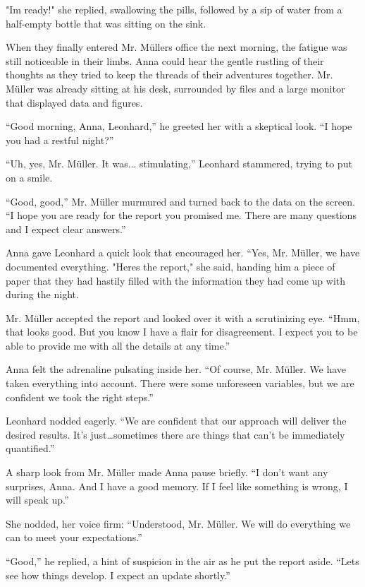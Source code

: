 \documentclass[
]{article}
\begin{document}
"I\textquotesingle m ready!" she replied, swallowing the pills, followed
by a sip of water from a half-empty bottle that was sitting on the sink.

When they finally entered Mr. Müller\textquotesingle s office the next
morning, the fatigue was still noticeable in their limbs. Anna could
hear the gentle rustling of their thoughts as they tried to keep the
threads of their adventures together. Mr. Müller was already sitting at
his desk, surrounded by files and a large monitor that displayed data
and figures.

``Good morning, Anna, Leonhard,'' he greeted her with a skeptical look.
``I hope you had a restful night?''

``Uh, yes, Mr. Müller. It was... stimulating,'' Leonhard stammered,
trying to put on a smile.

``Good, good,'' Mr. Müller murmured and turned back to the data on the
screen. ``I hope you are ready for the report you promised me. There are
many questions and I expect clear answers.''

Anna gave Leonhard a quick look that encouraged her. ``Yes, Mr. Müller,
we have documented everything. "Here\textquotesingle s the report," she
said, handing him a piece of paper that they had hastily filled with the
information they had come up with during the night.

Mr. Müller accepted the report and looked over it with a scrutinizing
eye. ``Hmm, that looks good. But you know I have a flair for
disagreement. I expect you to be able to provide me with all the details
at any time.''

Anna felt the adrenaline pulsating inside her. ``Of course, Mr. Müller.
We have taken everything into account. There were some unforeseen
variables, but we are confident we took the right steps.''

Leonhard nodded eagerly. ``We are confident that our approach will
deliver the desired results. It's just\ldots sometimes there are things
that can't be immediately quantified.''

A sharp look from Mr. Müller made Anna pause briefly. ``I don't want any
surprises, Anna. And I have a good memory. If I feel like something is
wrong, I will speak up.''

She nodded, her voice firm: ``Understood, Mr. Müller. We will do
everything we can to meet your expectations.''

``Good,'' he replied, a hint of suspicion in the air as he put the
report aside. ``Let\textquotesingle s see how things develop. I expect
an update shortly.''
\end{document}
